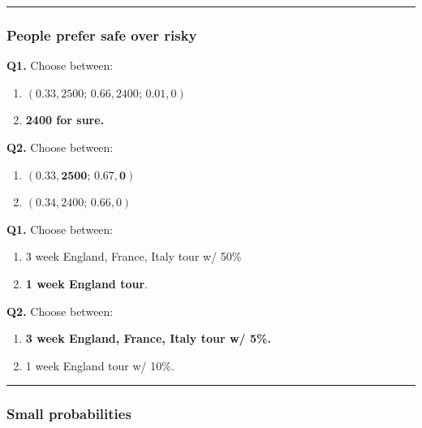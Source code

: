 \documentclass[
  letterpaper,
  DIV=11,
  numbers=noendperiod]{scrartcl}
\providecommand{\tightlist}{%
  \setlength{\itemsep}{0pt}\setlength{\parskip}{0pt}}\usepackage{longtable,booktabs,array}
\begin{document}
\begin{center}\rule{0.5\linewidth}{0.5pt}\end{center}

\subsubsection{People prefer safe over
risky}\label{people-prefer-safe-over-risky}

\textbf{Q1.} Choose between:

\begin{enumerate}
\def\labelenumi{(\Alph{enumi})}
\tightlist
\item
  \(\scriptstyle (0.33, 2500;\,0.66, 2400;\,0.01,0)\)
\item
  \textbf{2400 for sure.}
\end{enumerate}

\textbf{Q2.} Choose between: ~

\begin{enumerate}
\def\labelenumi{(\Alph{enumi})}
\setcounter{enumi}{2}
\tightlist
\item
  \(\boldsymbol{(0.33,2500;\,0.67,0)}\)
\item
  \((0.34,2400;\,0.66,0)\)
\end{enumerate}

\textbf{Q1.} Choose between:

\begin{enumerate}
\def\labelenumi{(\Alph{enumi})}
\tightlist
\item
  3 week England, France, Italy tour w/ 50\%
\item
  \textbf{1 week England tour}.
\end{enumerate}

\textbf{Q2.} Choose between: ~

\begin{enumerate}
\def\labelenumi{(\Alph{enumi})}
\setcounter{enumi}{2}
\tightlist
\item
  \textbf{3 week England, France, Italy tour w/ 5\%.}
\item
  1 week England tour w/ 10\%.
\end{enumerate}

\begin{center}\rule{0.5\linewidth}{0.5pt}\end{center}

\subsubsection{Small probabilities}\label{small-probabilities}
\end{document}
